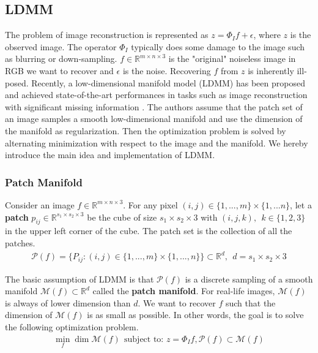 \documentclass[a4paper]{article}
\begin{document}
\subsection{LDMM}
The problem of image reconstruction is represented as $z = \Phi_I f + \epsilon$, where $z$ is the observed image. The operator $\Phi_I$ typically does some damage to the image such as blurring or down-sampling. $f \in \mathbb{R}^{m \times n \times 3}$ is the "original" noiseless image in RGB we want to recover and $\epsilon$ is the noise. Recovering $f$ from $z$ is inherently ill-posed. Recently, a low-dimensional manifold model (LDMM) has been proposed and achieved state-of-the-art performances in tasks such as image reconstruction with significant missing information \cite{ldmmimageprocessing} \cite{ldmmhyperspectral}. The authors assume that the patch set of an image samples a smooth low-dimensional manifold and use the dimension of the manifold as regularization. Then the optimization problem is solved by alternating minimization with respect to the image and the manifold. We hereby introduce the main idea and implementation of LDMM.\cite{nonlocallaplacian}

\subsubsection{Patch Manifold}
Consider an image $f \in \mathbb{R}^{m \times n \times 3}$. For any pixel $(i,j) \in \{1,...,m\}\times\{1,...n\}$, let a \textbf {patch} $p_{ij} \in \mathbb{R}^{s_1 \times s_2 \times 3}$ be the cube of size $s_1 \times s_2 \times 3$ with $(i,j,k), ~ ~k\in\{1,2,3\}$ in the upper left corner of the cube. The patch set is the collection of all the patches. 
\begin{align}
\mathcal{P}(f) = \{P_{ij} : (i,j) \in \{1,...,m\} \times \{1,...,n\} \} \subset \mathbb{R}^d,~ ~  d = s_1 \times s_2 \times 3
\end{align}

The basic assumption of LDMM is that $\mathcal{P}(f)$ is a discrete sampling of a smooth manifold $\mathcal{M}(f) \subset \mathbb{R}^{d}$ called the \textbf{patch manifold}. For real-life images, $\mathcal{M}(f)$ is always of lower dimension than $d$. We want to recover $f$ such that the dimension of $\mathcal{M}(f)$ is as small as possible. In other words, the goal is to solve the following optimization problem.
\begin{align}
\min_{f } \dim \mathcal{M}(f) ~ ~ \text{subject to: } z = \Phi_I f, \mathcal{P}(f) \subset \mathcal{M}(f)
\end{align}
\end{document}
